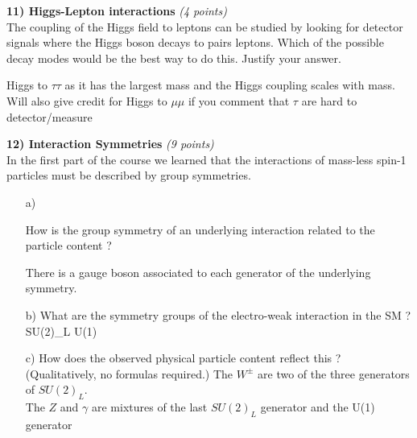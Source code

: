 {%
%
%
%
%
%

\clearpage

\textbf{11) Higgs-Lepton interactions } \hfill \textit{(4 points)}\\
The coupling of the Higgs field to leptons can be studied by looking for detector signals where the Higgs boson decays to pairs leptons.
Which of the possible decay modes would be the best way to do this.  Justify your answer.

\bc
Higgs to $\tau\tau$ as it has the largest mass and the Higgs coupling scales with mass. 
Will also give credit for Higgs to $\mu\mu$ if you comment that $\tau$ are hard to detector/measure
\ec

\vspace*{0.2in}

\textbf{12) Interaction Symmetries } \hfill \textit{(9 points)} \\ 
In the first part of the course we learned that the interactions of mass-less spin-1 particles must be described by group symmetries. 
\begin{itemize}
\item[a)]{How is the group symmetry of an underlying interaction related to the particle content ?

\bc
There is a gauge boson associated to each generator of the underlying symmetry.
\ec

}
\item[b)]{What are the symmetry groups of the electro-weak interaction in the SM ? 
\be
  SU(2)_L \times U(1)
\ee
}
\item[c)]{How does the observed physical particle content reflect this ? (Qualitatively, no formulas required.) 
\bc
The $W^\pm$ are two of the three generators of $SU(2)_L$.\\
The $Z$ and $\gamma$ are mixtures of the last $SU(2)_L$ generator and the U(1) generator
\ec
}


\end{itemize}}
